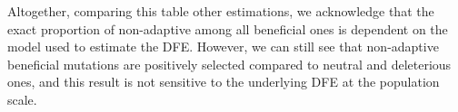\documentclass{article}
\begin{document}
    Altogether, comparing this table other estimations, we acknowledge that the exact proportion of non-adaptive among all beneficial ones is dependent on the model used to estimate the DFE.
    However, we can still see that non-adaptive beneficial mutations are positively selected compared to neutral and deleterious ones, and this result is not sensitive to the underlying DFE at the population scale.

    \newpage

    \newpage

    \printbibliography
\end{document}
